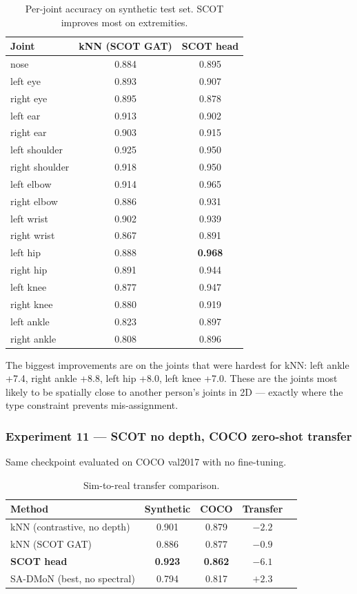 \begin{table}[H]
\centering
\footnotesize
\begin{tabular}{lcc}
\toprule
Joint & kNN (SCOT GAT) & SCOT head \\
\midrule
nose & 0.884 & 0.895 \\
left eye & 0.893 & 0.907 \\
right eye & 0.895 & 0.878 \\
left ear & 0.913 & 0.902 \\
right ear & 0.903 & 0.915 \\
left shoulder & 0.925 & 0.950 \\
right shoulder & 0.918 & 0.950 \\
left elbow & 0.914 & 0.965 \\
right elbow & 0.886 & 0.931 \\
left wrist & 0.902 & 0.939 \\
right wrist & 0.867 & 0.891 \\
left hip & 0.888 & \textbf{0.968} \\
right hip & 0.891 & 0.944 \\
left knee & 0.877 & 0.947 \\
right knee & 0.880 & 0.919 \\
left ankle & 0.823 & 0.897 \\
right ankle & 0.808 & 0.896 \\
\bottomrule
\end{tabular}
\caption{Per-joint accuracy on synthetic test set. SCOT improves most on extremities.}
\end{table}

The biggest improvements are on the joints that were hardest for kNN: left ankle +7.4, right ankle +8.8, left hip +8.0, left knee +7.0. These are the joints most likely to be spatially close to another person's joints in 2D --- exactly where the type constraint prevents mis-assignment.


\subsubsection{Experiment 11 --- SCOT no depth, COCO zero-shot transfer}

Same checkpoint evaluated on COCO val2017 with no fine-tuning.

\begin{table}[H]
\centering
\footnotesize
\begin{tabular}{lcccc}
\toprule
Method & Synthetic & COCO & Transfer \\
\midrule
kNN (contrastive, no depth) & 0.901 & 0.879 & $-2.2$ \\
kNN (SCOT GAT) & 0.886 & 0.877 & $-0.9$ \\
\textbf{SCOT head} & \textbf{0.923} & \textbf{0.862} & $-6.1$ \\
SA-DMoN (best, no spectral) & 0.794 & 0.817 & $+2.3$ \\
\bottomrule
\end{tabular}
\caption{Sim-to-real transfer comparison.}
\end{table}


